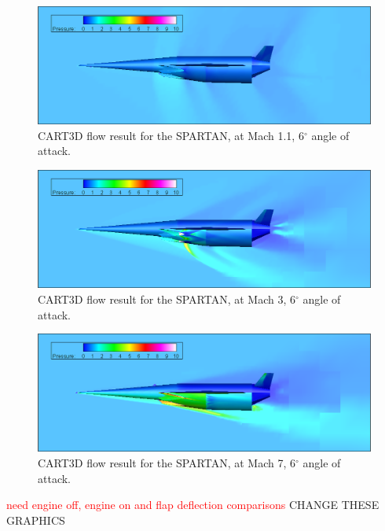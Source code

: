 \begin{figure}
	\centering
	\includegraphics[width=0.9\linewidth]{figures/3_vehicle_design/M1p1AoA6}
	\caption{CART3D flow result for the SPARTAN, at Mach 1.1, 6$^\circ$ angle of attack.}
	\label{fig:M1}
\end{figure}
\begin{figure}
	\centering
	\includegraphics[width=0.9\linewidth]{figures/3_vehicle_design/M3AoA6}
	\caption{CART3D flow result for the SPARTAN, at Mach 3, 6$^\circ$ angle of attack.}
	\label{fig:M3AoA6}
\end{figure}
\begin{figure}
	\centering
	\includegraphics[width=0.9\linewidth]{figures/3_vehicle_design/M7AoA6}
	\caption{CART3D flow result for the SPARTAN, at Mach 7, 6$^\circ$ angle of attack.}
	\label{fig:M7AoA6}
\end{figure}


\textcolor{red}{need engine off, engine on and flap deflection comparisons}
CHANGE THESE GRAPHICS

